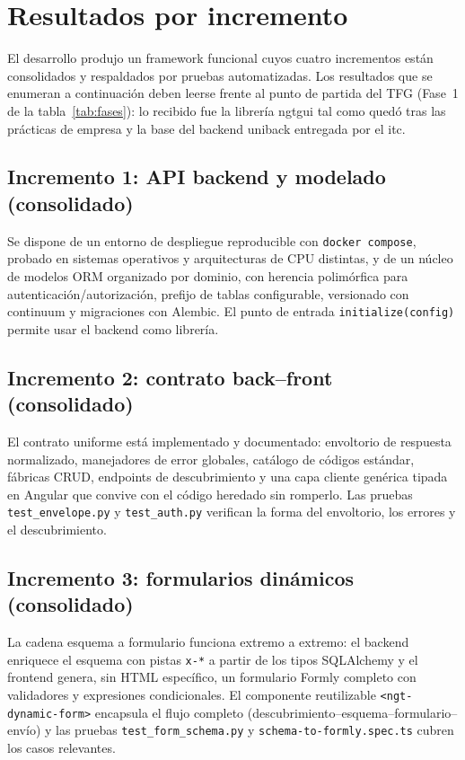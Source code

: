 \section{Resultados por incremento}
El desarrollo produjo un framework funcional cuyos cuatro incrementos están
consolidados y respaldados por pruebas automatizadas. Los resultados que se
enumeran a continuación deben leerse frente al punto de partida del TFG
(Fase~1 de la tabla~\ref{tab:fases}): lo recibido fue la librería \gls{ngtgui}
tal como quedó tras las prácticas de empresa y la base del backend
\gls{uniback} entregada por el \gls{itc}.

\subsection{Incremento 1: API backend y modelado (consolidado)}
Se dispone de un entorno de despliegue reproducible con \texttt{docker
compose}, probado en sistemas operativos y arquitecturas de CPU distintas, y
de un núcleo de modelos ORM organizado por dominio, con herencia polimórfica
para autenticación/autorización, prefijo de tablas configurable, versionado
con \gls{continuum} y migraciones con Alembic. El punto de entrada
\texttt{initialize(config)} permite usar el backend como librería.

\subsection{Incremento 2: contrato back--front (consolidado)}
El contrato uniforme está implementado y documentado: envoltorio de respuesta
normalizado, manejadores de error globales, catálogo de códigos estándar,
fábricas CRUD, endpoints de descubrimiento y una capa cliente genérica tipada
en Angular que convive con el código heredado sin romperlo. Las pruebas
\texttt{test\_envelope.py} y \texttt{test\_auth.py} verifican la forma del
envoltorio, los errores y el descubrimiento.

\subsection{Incremento 3: formularios dinámicos (consolidado)}
La cadena esquema a formulario funciona extremo a extremo: el
backend enriquece el esquema con pistas \texttt{x-*} a partir de los tipos
SQLAlchemy y el frontend genera, sin HTML específico, un formulario Formly
completo con validadores y expresiones condicionales. El componente
reutilizable \texttt{<ngt-dynamic-form>} encapsula el flujo completo
(descubrimiento--esquema--formulario--envío) y las pruebas 
\texttt{test\_form\_schema.py} y \texttt{schema-to-formly.spec.ts} cubren los casos relevantes.

